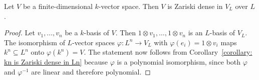 %   
%   
%   


\begin{corollary}
  \label{corollary: V is Zariski dense in VL}
  Let $V$ be a finite-dimensional $k$-vector space.
  Then $V$ is Zariski dense in $V_L$ over $L$.
\end{corollary}


\begin{proof}
  Let $v_1, \dotsc, v_n$ be a $k$-basis of $V$.
  Then $1 \otimes v_1, \dotsc, 1 \otimes v_n$ is an $L$-basis of $V_L$.
  The isomorphism of $L$-vector spaces $\varphi \colon L^n \to V_L$ with $\varphi(e_i) = 1 \otimes v_i$ maps $k^n \subseteq L^n$ onto $\varphi(k^n) = V$.
  The statement now follows from Corollary~\ref{corollary: kn is Zariski dense in Ln} because $\varphi$ is a polynomial isomorphism, since both $\varphi$ and $\varphi^{-1}$ are linear and therefore polynomial.
\end{proof}


